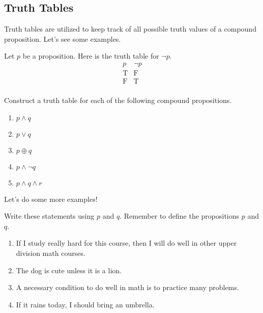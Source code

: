 \documentclass[../notes.tex]{subfiles}
\begin{document}
\subsection{Truth Tables} 
Truth tables are utilized to keep track of all possible truth values of a compound proposition. Let's see some examples.
\begin{example}
    Let $p$ be a proposition. Here is the truth table for $\lnot p$.
    \[\begin{array}{ c|c }
        p & \neg p\\\hline
        \text{T} & \text{F} \\
        \text{F} & \text{T} \\
    \end{array}\]
\end{example}
\begin{exercise}
    Construct a truth table for each of the following compound propositions.
    \begin{enumerate}[label=(\alph*)]
        \item $p \land q$
        \item $p \lor q$
        \item $p \oplus q$
        \item $p \land \neg q$
        \item $p \land q \land r$
    \end{enumerate}
\end{exercise}
Let's do some more examples! 
\begin{exercise}
    Write these statements using $p$ and $q$. Remember to define the propositions $p$ and $q$.
    \begin{enumerate}[label=(\alph*)]
        \item If I study really hard for this course, then I will do well in other upper division math courses. 
        \item The dog is cute unless it is a lion. 
        \item A necessary condition to do well in math is to practice many problems.
        \item If it rains today, I should bring an umbrella.
    \end{enumerate}
\end{exercise}
\end{document}
